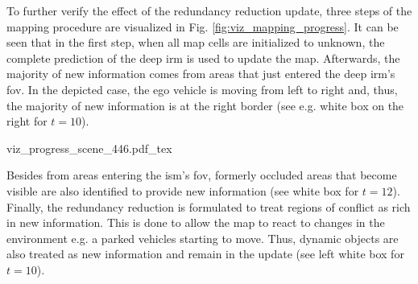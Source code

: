 \begin{center}
\end{center}
To further verify the effect of the redundancy reduction update, three steps of the mapping procedure are visualized in Fig. \ref{fig:viz_mapping_progress}. It can be seen that in the first step, when all map cells are initialized to unknown, the complete prediction of the deep \gls{irm} is used to update the map. Afterwards, the majority of new information comes from areas that just entered the deep \gls{irm}'s \gls{fov}. In the depicted case, the ego vehicle is moving from left to right and, thus, the majority of new information is at the right border (see e.g. white box on the right for $t=10$). 
\begin{center}
	{viz_progress_scene_446.pdf_tex}
\end{center}
Besides from areas entering the \gls{ism}'s \gls{fov}, formerly occluded areas that become visible are also identified to provide new information (see white box for $t=12$). Finally, the redundancy reduction is formulated to treat regions of conflict as rich in new information. This is done to allow the map to react to changes in the environment e.g. a parked vehicles starting to move. Thus, dynamic objects are also treated as new information and remain in the update (see left white box for $t=10$).
%

